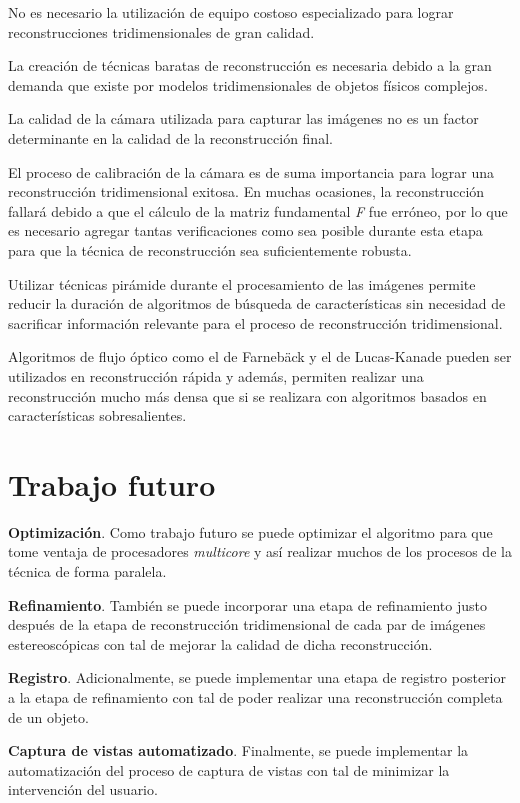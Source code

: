 \begin{itemize*}
\item No es necesario la utilizaci\'{o}n de equipo costoso especializado para lograr reconstrucciones tridimensionales de gran calidad.

\item La creaci\'{o}n de t\'{e}cnicas baratas de reconstrucci\'{o}n es necesaria debido a la gran demanda que existe por modelos tridimensionales de objetos f\'{i}sicos complejos.

\item La calidad de la c\'{a}mara utilizada para capturar las im\'{a}genes no es un factor determinante en la calidad de la reconstrucci\'{o}n final.

\item El proceso de calibraci\'{o}n de la c\'{a}mara es de suma importancia para lograr una reconstrucci\'{o}n tridimensional exitosa. En muchas ocasiones, la reconstrucci\'{o}n fallar\'{a} debido a que el c\'{a}lculo de la matriz fundamental \textit{F} fue err\'{o}neo, por lo que es necesario agregar tantas verificaciones como sea posible durante esta etapa para que la t\'{e}cnica de reconstrucci\'{o}n sea suficientemente robusta.

\item Utilizar t\'{e}cnicas pir\'{a}mide durante el procesamiento de las im\'{a}genes permite reducir la duraci\'{o}n de algoritmos de b\'{u}squeda de caracter\'{i}sticas sin necesidad de sacrificar informaci\'{o}n relevante para el proceso de reconstrucci\'{o}n tridimensional.

\item Algoritmos de flujo \'{o}ptico como el de Farnebäck y el de Lucas-Kanade pueden ser utilizados en reconstrucción r\'{a}pida y adem\'{a}s, permiten realizar una reconstrucci\'{o}n mucho m\'{a}s densa que si se realizara con algoritmos basados en caracter\'{i}sticas sobresalientes.
\end{itemize*}

\section{Trabajo futuro}
\textbf{Optimizaci\'{o}n}. Como trabajo futuro se puede optimizar el algoritmo para que tome ventaja de procesadores \textit{multicore} y así realizar muchos de los procesos de la t\'{e}cnica de forma paralela.

\textbf{Refinamiento}. Tambi\'{e}n se puede incorporar una etapa de refinamiento justo despu\'{e}s de la etapa de reconstrucci\'{o}n tridimensional de cada par de im\'{a}genes estereosc\'{o}picas con tal de mejorar la calidad de dicha reconstrucci\'{o}n. 

\textbf{Registro}. Adicionalmente, se puede implementar una etapa de registro posterior a la etapa de refinamiento con tal de poder realizar una reconstrucci\'{o}n completa de un objeto.

\textbf{Captura de vistas automatizado}. Finalmente, se puede implementar la automatizaci\'{o}n del proceso de captura de vistas con tal de minimizar la intervenci\'{o}n del usuario.